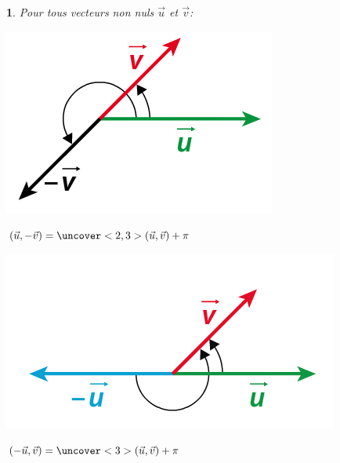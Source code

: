 \documentclass{beamer}
\newtheorem{proposition}[theorem]{\translate{Proposition}}
\theoremstyle{plain}
\begin{document}
\begin{frame}

\begin{proposition}
 Pour tous vecteurs non nuls $\vec{u}$ et $\vec{v}$:
 \begin{multicols}{2}
  
  \begin{center}
    \includegraphics[scale=0.5]{../Images/uMoinsv.png}
    
    $(\vec{u},-\vec{v})=\uncover<2,3>{(\vec{u},\vec{v})+\pi}$
  \end{center}

  
  \columnbreak 

    \begin{center}
    \includegraphics[scale=0.5]{../Images/moinsUetV.png}
    
    $(-\vec{u},\vec{v})=\uncover<3>{(\vec{u},\vec{v})+\pi}$
  \end{center}
  
  \end{multicols}
\end{proposition}

\end{frame}
\end{document}
